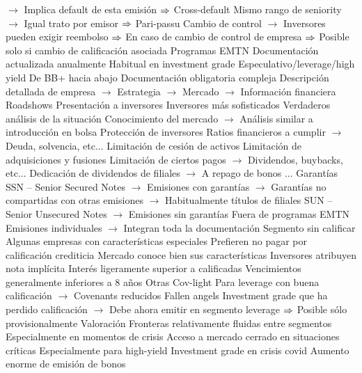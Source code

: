 \documentclass{nuevotema}
\begin{document}
\begin{esquemal}
				\4[] $\to$ Implica default de esta emisión
				\4[] $\Rightarrow$ Cross-default
				\4[] Mismo rango de seniority
				\4[] $\to$ Igual trato por emisor
				\4[] $\Rightarrow$ Pari-passu
				\4[] Cambio de control
				\4[] $\to$ Inversores pueden exigir reembolso
				\4[] $\Rightarrow$ En caso de cambio de control de empresa
				\4[] $\Rightarrow$ Posible solo si cambio de calificación asociada
				\4 Programas EMTN
				\4[] Documentación actualizada anualmente
				\4[] Habitual en investment grade
			\3 Especulativo/leverage/high yield
				\4 De BB+ hacia abajo
				\4 Documentación obligatoria compleja
				\4[] Descripción detallada de empresa
				\4[] $\to$ Estrategia
				\4[] $\to$ Mercado
				\4[] $\to$ Información financiera
				\4 Roadshows
				\4[] Presentación a inversores
				\4 Inversores más sofisticados
				\4[] Verdaderos análisis de la situación
				\4[] Conocimiento del mercado
				\4[] $\to$ Análisis similar a introducción en bolsa
				\4 Protección de inversores
				\4[] Ratios financieros a cumplir
				\4[] $\to$ Deuda, solvencia, etc...
				\4[] Limitación de cesión de activos
				\4[] Limitación de adquisiciones y fusiones
				\4[] Limitación de ciertos pagos
				\4[] $\to$ Dividendos, buybacks, etc...
				\4[] Dedicación de dividendos de filiales
				\4[] $\to$ A repago de bonos
				\4[] ...
				\4 Garantías
				\4[] SSN -- Senior Secured Notes
				\4[] $\to$ Emisiones con garantías
				\4[] $\to$ Garantías no compartidas con otras emisiones
				\4[] $\to$ Habitualmente títulos de filiales
				\4[] SUN -- Senior Unsecured Notes
				\4[] $\to$ Emisiones sin garantías
				\4 Fuera de programas EMTN
				\4[] Emisiones individuales
				\4[] $\to$ Integran toda la documentación
			\3 Segmento sin calificar
				\4 Algunas empresas con características especiales
				\4[] Prefieren no pagar por calificación crediticia
				\4[] Mercado conoce bien sus características
				\4 Inversores atribuyen nota implícita
				\4 Interés ligeramente superior a calificadas
				\4 Vencimientos generalmente inferiores a 8 años
			\3 Otras
				\4 Cov-light
				\4[] Para leverage con buena calificación
				\4[] $\to$ Covenants reducidos
				\4 Fallen angels
				\4[] Investment grade que ha perdido calificación
				\4[] $\to$ Debe ahora emitir en segmento leverage
				\4[] $\Rightarrow$ Posible sólo provisionalmente
			\3 Valoración
				\4 Fronteras relativamente fluidas entre segmentos
				\4[] Especialmente en momentos de crisis
				\4 Acceso a mercado cerrado en situaciones críticas
				\4[] Especialmente para high-yield
				\4 Investment grade en crisis covid
				\4[] Aumento enorme de emisión de bonos

\end{esquemal}
\end{document}
